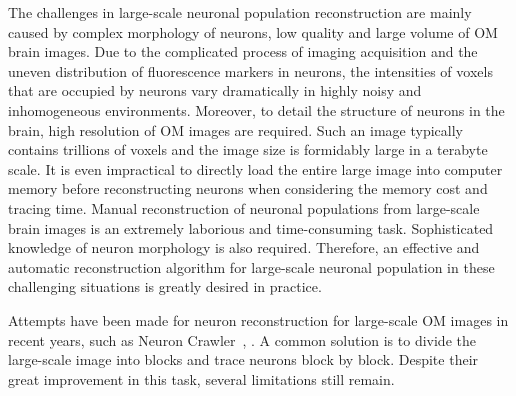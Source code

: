 The challenges in large-scale neuronal population reconstruction are mainly caused by complex morphology of neurons, low quality and large volume of OM brain images.
Due to the complicated process of imaging acquisition and the uneven distribution of fluorescence markers in neurons, the intensities of voxels that are occupied by neurons vary dramatically in highly noisy and inhomogeneous environments.
Moreover, to detail the structure of neurons in the brain, high resolution of OM images are required. Such an image typically contains trillions of voxels and the image size is formidably large in a terabyte scale. It is even impractical to directly load the entire large image into computer memory before reconstructing neurons when considering the memory cost and tracing time.
Manual reconstruction of neuronal populations from large-scale brain images is an extremely laborious and time-consuming task.
Sophisticated knowledge of neuron morphology is also required.
%
Therefore, an effective and automatic reconstruction algorithm for large-scale neuronal population in these challenging situations is greatly desired in practice.
 
 
Attempts have been made for neuron reconstruction for large-scale OM images in recent years, such as Neuron Crawler~\cite{Zhou2015}, .
A common solution is to divide the large-scale image into blocks and trace neurons block by block.
Despite their great improvement in this task, several limitations still remain.


